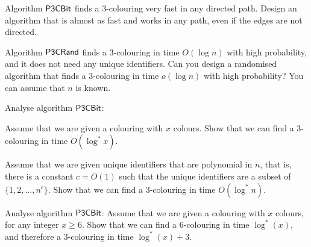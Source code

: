 \begin{ex}\label{ex:intro-undir-path}
    Algorithm $\textup{\sffamily P3CBit}$ finds a $3$-colouring very fast in any directed path. Design an algorithm that is almost as fast and works in any path, even if the edges are not directed.

\end{ex}

\begin{ex}
    Algorithm $\textup{\sffamily P3CRand}$ finds a $3$-colouring in time $O(\log n)$ with high probability, and it does not need any unique identifiers. Can you design a randomised algorithm that finds a $3$-colouring in time $o(\log n)$ with high probability? You can assume that $n$ is known.

\end{ex}

\begin{ex}\label{ex:logstar}
    Analyse algorithm $\textup{\sffamily P3CBit}$:
    \begin{subex}
        \item Assume that we are given a colouring with $x$ colours. Show that we can find a $3$-colouring in time $O(\log^* x)$.
        \item Assume that we are given unique identifiers that are polynomial in $n$, that is, there is a constant $c = O(1)$ such that the unique identifiers are a subset of $\{1,2,\dotsc,n^c\}$. Show that we can find a $3$-colouring in time $O(\log^* n)$.
    \end{subex}
\end{ex}

\begin{exs}\label{ex:logstar-tight}
    Analyse algorithm $\textup{\sffamily P3CBit}$:
    Assume that we are given a colouring with $x$ colours, for any integer $x \ge 6$. Show that we can find a $6$-colouring in time $\log^*(x)$, and therefore a $3$-colouring in time $\log^*(x) + 3$.
\end{exs}

